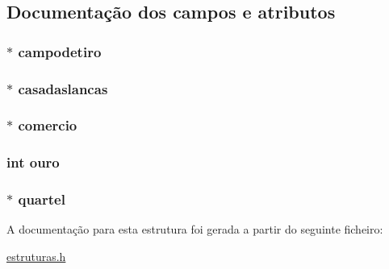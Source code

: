 \subsection{\-Documentação dos campos e atributos}
\hypertarget{structcastelo_aae60536f9b63f8bc5e72f56a43db0957}{
\subsubsection[{campodetiro}]{$\ast$ {\bf campodetiro}}}\label{structcastelo_aae60536f9b63f8bc5e72f56a43db0957}
\hypertarget{structcastelo_ae572d9e86d21727762f7f9e6bc8b4b46}{
\subsubsection[{casadaslancas}]{$\ast$ {\bf casadaslancas}}}\label{structcastelo_ae572d9e86d21727762f7f9e6bc8b4b46}
\hypertarget{structcastelo_a6ba479b07d3d17eb15796ed601738375}{
\subsubsection[{comercio}]{$\ast$ {\bf comercio}}}\label{structcastelo_a6ba479b07d3d17eb15796ed601738375}
\hypertarget{structcastelo_afc6393ec87ac2f385cad47984d32b00b}{
\subsubsection[{ouro}]{\setlength{\rightskip}{0pt plus 5cm}int {\bf ouro}}}\label{structcastelo_afc6393ec87ac2f385cad47984d32b00b}
\hypertarget{structcastelo_a0d096fd01efb245bb3fed56f87da404c}{
\subsubsection[{quartel}]{$\ast$ {\bf quartel}}}\label{structcastelo_a0d096fd01efb245bb3fed56f87da404c}


\-A documentação para esta estrutura foi gerada a partir do seguinte ficheiro\-:\begin{DoxyCompactItemize}
\item 
\hyperlink{estruturas_8h}{estruturas.\-h}\end{DoxyCompactItemize}
